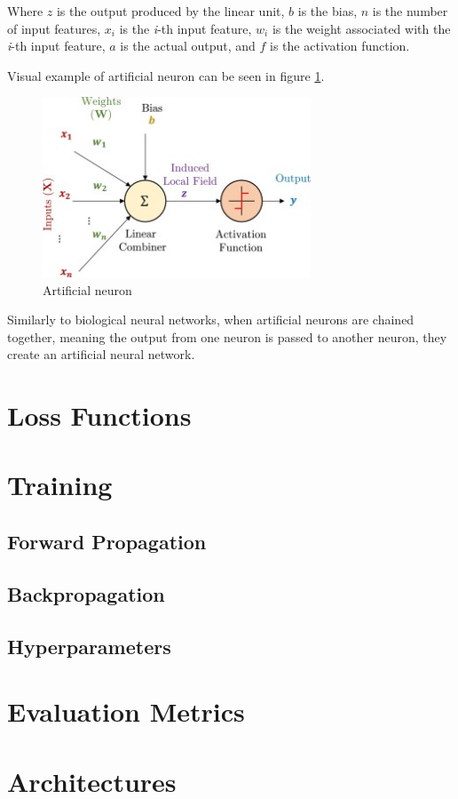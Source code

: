 Where $z$ is the output produced by the linear unit, $b$ is the bias, $n$ is the number of input features, $x_i$ is the \textit{i}-th input feature, $w_i$ is the weight associated with the \textit{i}-th input feature, $a$ is the actual output, and $f$ is the activation function.

Visual example of artificial neuron can be seen in figure \ref{tab:artificial-neuron}.

\begin{figure}[H]
\begin{centering}
\includegraphics[width=8cm]{assets/images/neuron.jpg}
\par\end{centering}
\caption{Artificial neuron \cite{Santosh2022-1}}
\label{tab:artificial-neuron}
\end{figure}

Similarly to biological neural networks, when artificial neurons are chained together, meaning the output from one neuron is passed to another neuron, they create an artificial neural network.

\section{Loss Functions}

\section{Training}

\subsection{Forward Propagation}

\subsection{Backpropagation}

\subsection{Hyperparameters}

\section{Evaluation Metrics}

\section{Architectures}
